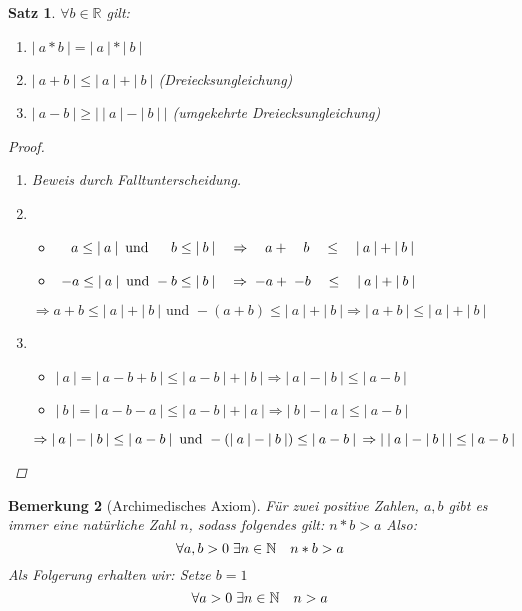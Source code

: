 \documentclass[a4paper,titlepage,oneside]{article}
\def\N{\ensuremath{\mathbb{N}} }
\def\R{\ensuremath{\mathbb{R}} }
\def\fa{\ensuremath{\forall}}
\def\ex{\ensuremath{\exists}}
\def\sp{\hspace{0,1cm}}
\newcommand{\abs}[1]{\ensuremath{\left|\:#1\:\right|}}
\theoremstyle{thmstyle}
\newtheorem{satz}{Satz}[subsection]
\newtheorem{bem}[satz]{Bemerkung}
\begin{document}
\newpage
\begin{satz}
\(\fa b \in \R\) gilt:
\begin{enumerate}[label=(\arabic*)]
	\item \(\abs{a * b} = \abs{a} * \abs{b}\)
	\item \(\abs{a + b} \le \abs{a} + \abs{b}\) (Dreiecksungleichung)
	\item \(\abs{a - b} \ge \abs{\abs{a} - \abs{b}}\) (umgekehrte Dreiecksungleichung)
\end{enumerate}
\begin{proof}\sp
\begin{enumerate}[label=(\arabic*)]
	\item Beweis durch Falltunterscheidung.
	\item \begin{itemize}
		\item \(\quad a \le \abs{a} \text{ und } \sp \quad b \le \abs{b} \quad \Rightarrow \quad a + \quad b \quad\le\quad \abs{a}+\abs{b} \) 
		\item \(\sp-a \le \abs{a} \text{ und } -b \le \abs{b} \quad \Rightarrow \sp -a + \sp -b \quad\le\quad \abs{a} +\abs{b} \)
		\end{itemize}
		\(\Rightarrow a + b \le \abs{a} + \abs{b} \text{ und } -(a + b) \le \abs{a} + \abs{b} \Rightarrow \abs{a + b} \le \abs{a} + \abs{b} \)
	\item \begin{itemize}
		\item \(\abs{a} = \abs{a - b + b} \le \abs{a - b} + \abs{b} \Rightarrow \abs{a} - \abs{b} \le \abs{a-b}\)
		\item \(\abs{b} = \abs{a - b - a} \le \abs{a - b} + \abs{a} \Rightarrow \abs{b} - \abs{a} \le \abs{a-b}\)
		\end{itemize}
		\(\Rightarrow \abs{a} - \abs{b} \le \abs{a-b} \text{ und } - (\abs{a} - \abs{b}) \le \abs{a-b} \\
	\Rightarrow \abs{\abs{a} - \abs{b}} \le \abs{a-b}\)
\end{enumerate}
\end{proof}
\end{satz}

\begin{bem}[Archimedisches Axiom]
Für zwei positive Zahlen, \(a, b\) gibt es immer eine natürliche Zahl $n$, sodass folgendes gilt: \(n * b > a\) Also:
\[\fa a,b > 0 \sp \ex n \in \N \quad n * b > a\]
Als Folgerung erhalten wir: Setze \(b = 1\)
\[\fa a > 0 \sp \ex n \in \N \quad n > a\]
\end{bem}
\end{document}

